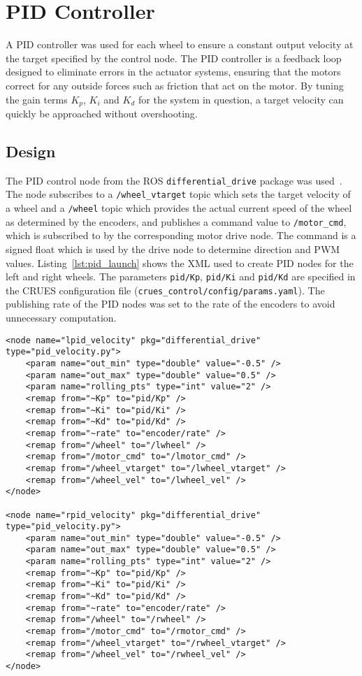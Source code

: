 \section{PID Controller}\label{soft/PID}
A PID controller was used for each wheel to ensure a constant output
velocity at the target specified by the control node. The PID controller is
a feedback loop designed to eliminate errors in the actuator systems, ensuring
that the motors correct for any outside forces such as friction that act on the
motor. By tuning the gain terms $K_p$, $K_i$ and $K_d$ for the system in
question, a target velocity can quickly be approached without overshooting.

\subsection{Design}\label{soft/PID/design}
The PID control node from the ROS \verb|differential_drive| package was
used~\cite{diffdrivelib}. The node subscribes to a \verb|/wheel_vtarget| topic
which sets the target velocity of a wheel and a \verb|/wheel| topic which provides
the actual current speed of the wheel as determined by the encoders, and publishes
a command value to \verb|/motor_cmd|, which is subscribed to by the corresponding
motor drive node. The command is a signed float which is used by the drive node
to determine direction and PWM values. Listing~\ref{lst:pid_launch} shows the
XML used to create PID nodes for the left and right wheels. The parameters
\verb|pid/Kp|, \verb|pid/Ki| and \verb|pid/Kd| are specified in the CRUES
configuration file (\verb|crues_control/config/params.yaml|). The publishing rate
of the PID nodes was set to the rate of the encoders to avoid unnecessary
computation.

\begin{lstlisting}[caption={PID nodes in ROS launch file}, label={lst:pid_launch}, style=xml]
<node name="lpid_velocity" pkg="differential_drive" type="pid_velocity.py">
    <param name="out_min" type="double" value="-0.5" />
    <param name="out_max" type="double" value="0.5" />
    <param name="rolling_pts" type="int" value="2" />
    <remap from="~Kp" to="pid/Kp" />
    <remap from="~Ki" to="pid/Ki" />
    <remap from="~Kd" to="pid/Kd" />
    <remap from="~rate" to="encoder/rate" />
    <remap from="/wheel" to="/lwheel" />
    <remap from="/motor_cmd" to="/lmotor_cmd" />
    <remap from="/wheel_vtarget" to="/lwheel_vtarget" />
    <remap from="/wheel_vel" to="/lwheel_vel" />
</node>

<node name="rpid_velocity" pkg="differential_drive" type="pid_velocity.py">
    <param name="out_min" type="double" value="-0.5" />
    <param name="out_max" type="double" value="0.5" />
    <param name="rolling_pts" type="int" value="2" />
    <remap from="~Kp" to="pid/Kp" />
    <remap from="~Ki" to="pid/Ki" />
    <remap from="~Kd" to="pid/Kd" />
    <remap from="~rate" to="encoder/rate" />
    <remap from="/wheel" to="/rwheel" />
    <remap from="/motor_cmd" to="/rmotor_cmd" />
    <remap from="/wheel_vtarget" to="/rwheel_vtarget" />
    <remap from="/wheel_vel" to="/rwheel_vel" />
</node>
\end{lstlisting}

